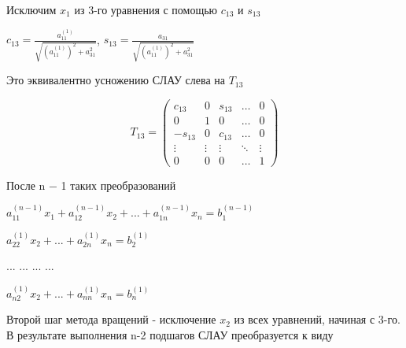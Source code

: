  Исключим 
 \begin{math}
 	x_{1}
 \end{math} 
из 3-го уравнения с помощью 
\begin{math}
	c_{13}
\end{math} и
\begin{math}
	s_{13}
\end{math} 

\begin{math}
	c_{13}=\frac{a_{11}^{(1)}}{\sqrt{(a_{11}^{(1)})^{2}+a_{31}^{2}}}
\end{math},
\begin{math}
	s_{13}=\frac{a_{31}}{\sqrt{(a_{11}^{(1)})^{2}+a_{31}^{2}}}
\end{math}

Это эквивалентно усножению СЛАУ слева на 
\begin{math}
	T_{13}
\end{math}

\begin{equation*}
	T_{13} = \left(
	\begin{array}{ccccc}
		c_{13} & 0 & s_{13}  & \ldots & 0\\
		0 & 1 & 0 & \ldots & 0\\
		-s_{13} & 0 & c_{13} & \ldots & 0\\
		\vdots & \vdots & \vdots & \ddots & \vdots\\
		0 & 0 & 0 & \ldots & 1
	\end{array}
	\right)
\end{equation*}

После n − 1 таких преобразований

\begin{math}
	a_{11}^{(n-1)}x_{1}+a_{12}^{(n-1)}x_{2}+...+a_{1n}^{(n-1)}x_{n}=b_{1}^{(n-1)}
\end{math}

\begin{math}
	a_{22}^{(1)}x_{2}+...+a_{2n}^{(1)}x_{n}=b_{2}^{(1)}
\end{math}

...   ...   ...   ...

\begin{math}
	a_{n2}^{(1)}x_{2}+...+a_{nn}^{(1)}x_{n}=b_{n}^{(1)}
\end{math}

Второй шаг метода вращений - исключение 
\begin{math}
	x_{2}
\end{math} 
из всех уравнений, начиная с 3-го. В результате выполнения n-2 подшагов СЛАУ преобразуется к виду

